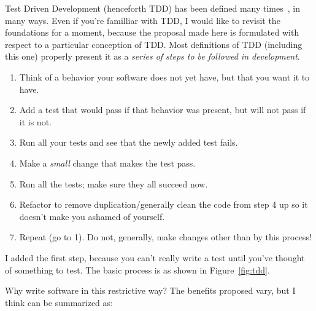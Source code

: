 \documentclass[sigplan,screen]{acmart}
\begin{document}
Test Driven Development (henceforth TDD) has been defined many times~\cite{beck2002test,astels2003test,TDDIBM,TDDAcademy},
in many ways.  Even if you're familliar with TDD, I would like to
revisit the foundations for a moment, because the proposal made here
is formulated with respect to a particular conception of TDD.  Most
definitions of TDD (including this one) properly present it as a
\emph{series of steps to be followed in development}.

\begin{enumerate}
  \item Think of a behavior your software does not yet have,
    but that you want it to have.
    \item Add a test that would pass if that behavior was present, but
      will not pass if it is not.
    \item Run all your tests and see that the newly added test fails.
    \item Make a \emph{small} change that makes the test pass.
    \item Run all the tests; make sure they all succeed now.
      \item Refactor to remove duplication/generally clean the code
        from step 4 up so it doesn't make you ashamed of yourself.
        \item Repeat (go to 1).  Do not, generally, make changes other than by
          this process!
      \end{enumerate}

I added the first step, because you can't really write a test until
you've thought of something to test.  The basic process is as shown in Figure~\ref{fig:tdd}.


Why write software in this restrictive way?  The benefits proposed
vary, but I think can be summarized as:
\end{document}
